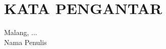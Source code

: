 	\chapter*{KATA PENGANTAR}
	\vspace{1cm}
	
\qquad\lipsum[1-3]

\begin{flushright}
	Malang, ...\\
	\vspace{1.5cm}
	Nama Penulis
\end{flushright}
\cleardoublepage

